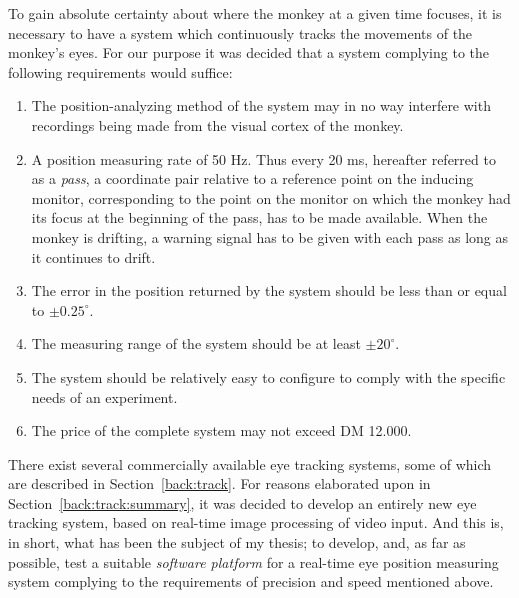 To gain absolute certainty about where the monkey at a given time
focuses, it is necessary to have a system which continuously tracks
the movements of the monkey's eyes.  For our purpose it was decided
that a system complying to the following requirements would suffice:
\begin{enumerate}
\item The position-analyzing method of the system may in no way
  interfere with recordings being made from the visual cortex of the
  monkey.
\item\label{req:first}A position measuring rate of 50 Hz.  Thus every
  20 ms, hereafter referred to as a {\em pass\/}, a coordinate pair
  relative to a reference point on the inducing monitor, corresponding
  to the point on the monitor on which the monkey had its focus at the
  beginning of the pass, has to be made available.  When the monkey is
  drifting, a warning signal has to be given with each pass as long as
  it continues to drift.
\item\label{req:2} The error in the position returned by the system
  should be less than or equal to $\pm 0.25^{\circ}$.
\item\label{req:3}The measuring range of the system should be at least
  $\pm 20^{\circ}$.
\item\label{req:4}The system should be relatively easy to configure to
  comply with the specific needs of an experiment.
\item\label{req:last}The price of the complete system may not exceed
  DM 12.000.
\end{enumerate}

There exist several commercially available eye tracking systems, some
of which are described in Section~\ref{back:track}.  For reasons
elaborated upon in Section~\ref{back:track:summary}, it was decided to
develop an entirely new eye tracking system, based on real-time image
processing of video input.  And this is, in short, what has been the
subject of my thesis; to develop, and, as far as possible, test a
suitable {\em software platform\/} for a real-time eye position
measuring system complying to the requirements of precision and speed
mentioned above.

